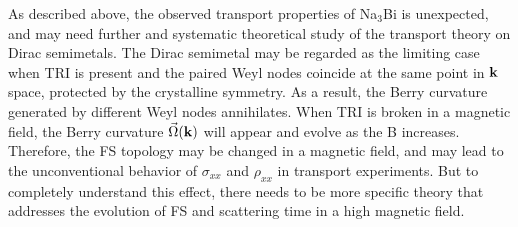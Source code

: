 As described above, the observed transport properties of Na$_3$Bi is unexpected, and may need further and systematic theoretical study of the transport theory on Dirac semimetals. The Dirac semimetal may be regarded as the limiting case when TRI is present and the paired Weyl nodes coincide at the same point in $\bf k$ space, protected by the crystalline symmetry. As a result, the Berry curvature generated by different Weyl nodes annihilates. When TRI is broken in a magnetic field, the Berry curvature $\vec{\Omega}(\bf k)$ will appear and evolve as the B increases. Therefore, the FS topology may be changed in a magnetic field, and may lead to the unconventional behavior of  $\sigma_{xx}$ and $\rho_{xx}$ in transport experiments. But to completely understand this effect, there needs to be more specific theory that addresses the evolution of FS and scattering time in a high magnetic field.








%

















\hfill \break

